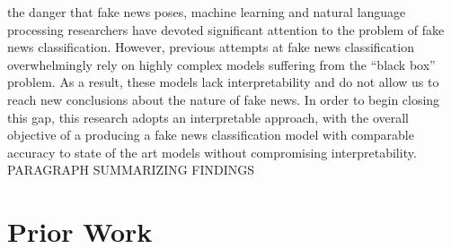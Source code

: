 \documentclass[12pt]{article}
\begin{document}
the danger that fake news poses, machine learning and natural language
processing researchers have devoted significant attention to the problem
of fake news classification. However, previous attempts at fake news
classification overwhelmingly rely on highly complex models suffering
from the ``black box'' problem. As a result, these models lack
interpretability and do not allow us to reach new conclusions about the
nature of fake news. In order to begin closing this gap, this research
adopts an interpretable approach, with the overall objective of a
producing a fake news classification model with comparable accuracy to
state of the art models without compromising interpretability.\\
\hspace*{0.333em}\hspace*{0.333em}\hspace*{0.333em}\hspace*{0.333em}\hspace*{0.333em}PARAGRAPH
SUMMARIZING FINDINGS

\section{Prior Work}
\label{sec:verify}
\end{document}

